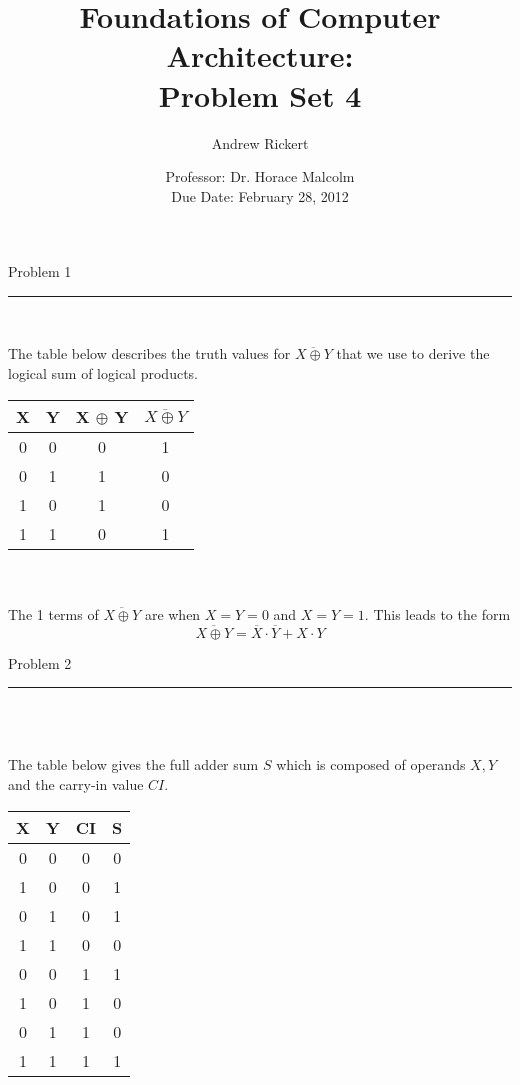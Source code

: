 \documentclass[11pt,reqno]{article}
\title{Foundations of Computer Architecture: \\ Problem Set 4 }
\author{Andrew Rickert}
\date{Professor: Dr. Horace Malcolm \\ \hspace{-19pt} Due Date: February 28,  2012}                                           %
\begin{document}
\maketitle


\begin{flushleft} 
Problem 1 \\
\rule{500pt}{1pt}\\
\end{flushleft} 

The table below describes the truth values for $\overline{X \oplus Y}$ that we use to derive the logical sum of logical products.\\

\setlength{\extrarowheight}{2.0pt}
\begin{tabular}{| c | c | c | c |}
\hline
X & Y & X $\oplus$ Y & $\overline{X \oplus Y}$ \\ \hline
0 & 0 & 0 & 1 \\ \hline
0 & 1 & 1 & 0 \\ \hline
1 & 0 & 1 & 0 \\ \hline
1 & 1 & 0 & 1 \\ \hline
\end{tabular}\\ \\

\noindent The 1 terms of $\overline{X \oplus Y}$ are when $X = Y = 0$ and $X = Y = 1$. This leads to the form
\[ \overline{X \oplus Y} = \overline{X} \cdot \overline{Y} + X \cdot Y \]
\newpage

\begin{flushleft} 
Problem 2 \\
\rule{500pt}{1pt}\\
\end{flushleft} 

\noindent{}\\ 

The table below gives the full adder sum $S$ which is composed of operands $X,Y$ and the carry-in value $CI$.\\

\setlength{\extrarowheight}{0pt}
\begin{tabular}{| c | c | c | c |}
\hline
X & Y & CI & S \\ \hline
0 & 0 & 0 & 0 \\ \hline
1 & 0 & 0 & 1 \\ \hline
0 & 1 & 0 & 1 \\ \hline
1 & 1 & 0 & 0 \\ \hline
0 & 0 & 1 & 1 \\ \hline
1 & 0 & 1 & 0 \\ \hline
0 & 1 & 1 & 0 \\ \hline
1 & 1 & 1 & 1 \\ \hline
\end{tabular}\\ \\
\end{document}
